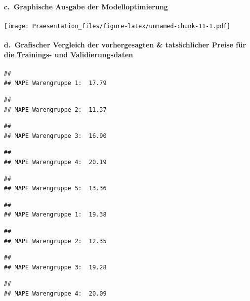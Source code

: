 \documentclass[
]{article}
\begin{document}
\hypertarget{c.-graphische-ausgabe-der-modelloptimierung}{%
\paragraph{c.~Graphische Ausgabe der
Modelloptimierung}\label{c.-graphische-ausgabe-der-modelloptimierung}}

\texttt{[image: Praesentation\_files/figure-latex/unnamed-chunk-11-1.pdf]}

\hypertarget{d.-grafischer-vergleich-der-vorhergesagten-tatsuxe4chlicher-preise-fuxfcr-die-trainings--und-validierungsdaten}{%
\paragraph{d.~Grafischer Vergleich der vorhergesagten \& tatsächlicher
Preise für die Trainings- und
Validierungsdaten}\label{d.-grafischer-vergleich-der-vorhergesagten-tatsuxe4chlicher-preise-fuxfcr-die-trainings--und-validierungsdaten}}

\begin{verbatim}
## 
## MAPE Warengruppe 1:  17.79
\end{verbatim}

\begin{verbatim}
## 
## MAPE Warengruppe 2:  11.37
\end{verbatim}

\begin{verbatim}
## 
## MAPE Warengruppe 3:  16.90
\end{verbatim}

\begin{verbatim}
## 
## MAPE Warengruppe 4:  20.19
\end{verbatim}

\begin{verbatim}
## 
## MAPE Warengruppe 5:  13.36
\end{verbatim}

\begin{verbatim}
## 
## MAPE Warengruppe 1:  19.38
\end{verbatim}

\begin{verbatim}
## 
## MAPE Warengruppe 2:  12.35
\end{verbatim}

\begin{verbatim}
## 
## MAPE Warengruppe 3:  19.28
\end{verbatim}

\begin{verbatim}
## 
## MAPE Warengruppe 4:  20.09
\end{verbatim}
\end{document}
